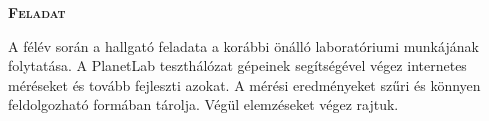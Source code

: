 %

\vspace{1.4cm}

\noindent
\textsc{\Huge \textbf{Feladat}}

\bigskip

A félév során a hallgató feladata a korábbi önálló laboratóriumi munkájának folytatása. A PlanetLab teszthálózat gépeinek segítségével végez internetes méréseket és tovább fejleszti azokat. A mérési eredményeket szűri és könnyen feldolgozható formában tárolja. Végül elemzéseket végez rajtuk.





%
%
%
%
%





